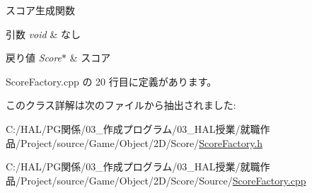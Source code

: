 スコア生成関数 


\begin{DoxyParams}{引数}
{\em void} & なし \\
\hline
\end{DoxyParams}

\begin{DoxyRetVals}{戻り値}
{\em Score$\ast$} & スコア \\
\hline
\end{DoxyRetVals}


 Score\+Factory.\+cpp の 20 行目に定義があります。



このクラス詳解は次のファイルから抽出されました\+:\begin{DoxyCompactItemize}
\item 
C\+:/\+H\+A\+L/\+P\+G関係/03\+\_\+作成プログラム/03\+\_\+\+H\+A\+L授業/就職作品/\+Project/source/\+Game/\+Object/2\+D/\+Score/\mbox{\hyperlink{_score_factory_8h}{Score\+Factory.\+h}}\item 
C\+:/\+H\+A\+L/\+P\+G関係/03\+\_\+作成プログラム/03\+\_\+\+H\+A\+L授業/就職作品/\+Project/source/\+Game/\+Object/2\+D/\+Score/\+Source/\mbox{\hyperlink{_score_factory_8cpp}{Score\+Factory.\+cpp}}\end{DoxyCompactItemize}

